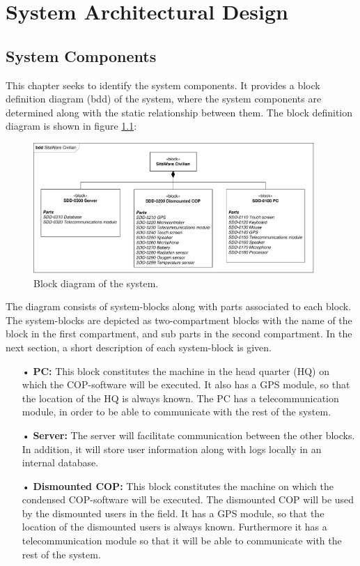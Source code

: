 \chapter{System Architectural Design}

\section{System Components}



This chapter seeks to identify the system components. It provides a block definition diagram (bdd) of the system, where the system components are determined along with the static relationship between them. The block definition diagram is shown in figure \ref{fig:block_diagram}:

\begin{figure}[H]
\centering
\includegraphics[width=0.95\textwidth]
{billeder/bdd_overordnet.pdf}
\caption{Block diagram of the system.}
\label{fig:block_diagram}
\end{figure}

The diagram consists of system-blocks along with parts associated to each block. The system-blocks are depicted as two-compartment blocks with the name of the block in the first compartment, and sub parts in the second compartment. In the next section, a short description of each system-block is given.

\begin{enumerate}
\item[•] \textbf{PC:} This block constitutes the machine in the head quarter (HQ) on which the COP-software will be executed. It also has a GPS module, so that the location of the HQ is always known. The PC has a telecommunication module, in order to be able to communicate with the rest of the system.
\item[•] \textbf{Server:} The server will facilitate communication between the other blocks. In addition, it will store user information along with logs locally in an internal database.
\item[•] \textbf{Dismounted COP:} This block constitutes the machine on which the condensed COP-software will be executed. The dismounted COP will be used by the dismounted users in the field. It has a GPS module, so that the location of the dismounted users is always known. Furthermore it has a telecommunication module so that it will be able to communicate with the rest of the system. 
\end{enumerate}

